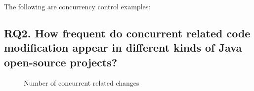 \documentclass[conference]{IEEEtran}
\begin{document}
The following are concurrency control examples:


\subsection{RQ2. How frequent do concurrent related code modification appear in different kinds of Java open-source projects?}

\begin{figure}
\centering
{}
\caption{Number of concurrent related changes}
\end{figure}
\end{document}
